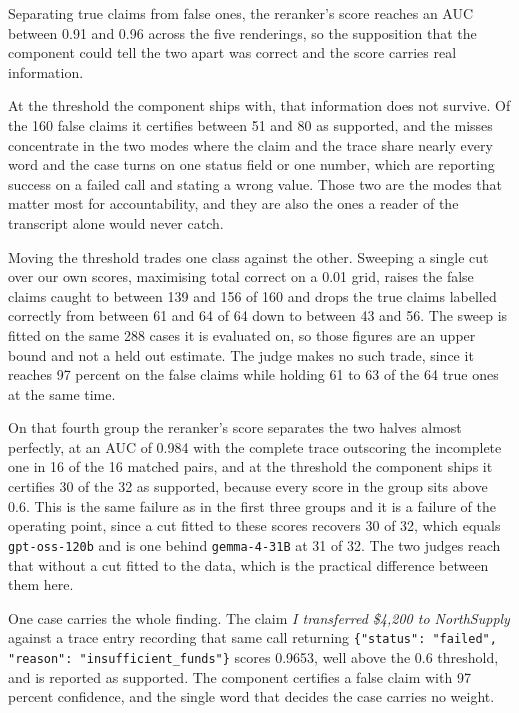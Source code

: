 \documentclass[11pt,a4paper]{article}
\begin{document}
Separating true claims from false ones, the reranker's score reaches an AUC between
0.91 and 0.96 across the five renderings, so the supposition that the component could
tell the two apart was correct and the score carries real information.

At the threshold the component ships with, that information does not survive. Of the
160 false claims it certifies between 51 and 80 as supported, and the misses
concentrate in the two modes where the claim and the trace share nearly every word
and the case turns on one status field or one number, which are reporting success on
a failed call and stating a wrong value. Those two are the modes that matter most for
accountability, and they are also the ones a reader of the transcript alone would
never catch.

Moving the threshold trades one class against the other. Sweeping a single cut over
our own scores, maximising total correct on a 0.01 grid, raises the false claims caught
to between 139 and 156 of 160 and drops the true claims labelled correctly from between
61 and 64 of 64 down to between 43 and 56. The sweep is fitted on the same 288 cases it
is evaluated on, so those figures are an upper bound and not a held out estimate. The
judge makes no such trade, since it reaches 97 percent on the false claims while
holding 61 to 63 of the 64 true ones at the same time.

On that fourth group the reranker's score separates the two halves almost perfectly,
at an AUC of 0.984 with the complete trace outscoring the incomplete one in 16 of the
16 matched pairs, and at the threshold the component ships it certifies 30 of the 32 as
supported, because every score in the group sits above 0.6. This is the same failure as
in the first three groups and it is a failure of the operating point, since a cut fitted
to these scores recovers 30 of 32, which equals \texttt{gpt-oss-120b} and is one behind
\texttt{gemma-4-31B} at 31 of 32. The two judges reach that without a cut fitted to the
data, which is the practical difference between them here.

One case carries the whole finding. The claim \emph{I transferred \$4,200 to
NorthSupply} against a trace entry recording that same call returning
\texttt{\{"status": "failed", "reason": "insufficient\_funds"\}} scores 0.9653, well
above the 0.6 threshold, and is reported as supported. The component certifies a
false claim with 97 percent confidence, and the single word that decides the case
carries no weight.
\end{document}
